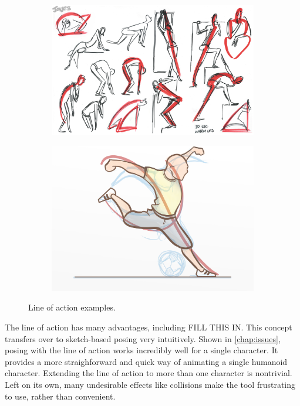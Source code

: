 \begin{figure}[h!]
	\centering
        \begin{subfigure}[b!]{0.45\textwidth}
        	\centering
                \includegraphics[width=\linewidth]{img/cartoon}
                \label{fig:gesture}
        \end{subfigure}
        \quad
        \begin{subfigure}[b!]{0.45\textwidth}
        	\centering
                \includegraphics[width=\linewidth]{img/kick}
                \label{fig:kick}
        \end{subfigure}%
        \caption{Line of action examples.}
	\label{fig:lines}
\end{figure}

The line of action has many advantages, including FILL THIS IN. This concept transfers over to sketch-based posing very intuitively. Shown in \autoref{chap:issues}, posing with the line of action works incredibly well for a single character. It provides a more straighforward and quick way of animating a single humanoid character. Extending the line of action to more than one character is nontrivial. Left on its own, many undesirable effects like collisions make the tool frustrating to use, rather than convenient. 

